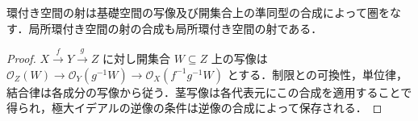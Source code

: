 \begin{prop}[環付き空間の射の合成]
環付き空間の射は基礎空間の写像及び開集合上の準同型の合成によって圏をなす．局所環付き空間の射の合成も局所環付き空間の射である．
\end{prop}
\begin{proof}
$X\xrightarrow fY\xrightarrow gZ$ に対し開集合 $W\subseteq Z$ 上の写像は $\mathcal O_Z(W)\to\mathcal O_Y(g^{-1}W)\to\mathcal O_X(f^{-1}g^{-1}W)$ とする．制限との可換性，単位律，結合律は各成分の写像から従う．茎写像は各代表元にこの合成を適用することで得られ，極大イデアルの逆像の条件は逆像の合成によって保存される．
\end{proof}
